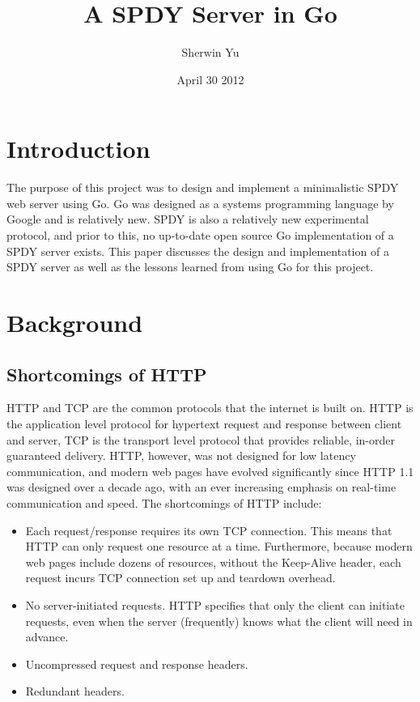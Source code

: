 \documentclass{article}
\begin{document}
\title{A SPDY Server in Go}
\author{Sherwin Yu}
\date{April 30 2012}
\maketitle

\section{Introduction}
\label{Abstract}
The purpose of this project was to design and implement a minimalistic SPDY web server using Go. Go was designed as a systems programming language by Google and is relatively new.  SPDY is also a relatively new experimental protocol, and prior to this, no up-to-date open source Go implementation of a SPDY server exists. This paper discusses the design and implementation of a SPDY server as well as the lessons learned from using Go for this project.

\section{Background}
\label{motivation}
\subsection{Shortcomings of HTTP}
HTTP and TCP are the common protocols that the internet is built on. HTTP is the application level protocol for hypertext request and response between client and server, TCP is the transport level protocol that provides reliable, in-order guaranteed delivery. 
HTTP, however, was not designed for low latency communication, and modern web pages have evolved significantly since HTTP 1.1 was designed over a decade ago, with an ever increasing emphasis on real-time communication and speed. The shortcomings of HTTP include:
\begin{itemize}
  \item Each request/response requires its own TCP connection. This means that HTTP can only request one resource at a time. Furthermore, because modern web pages include dozens of resources, without the Keep-Alive header, each request incurs TCP connection set up and teardown overhead.
  \item No server-initiated requests. HTTP specifies that only the client can initiate requests, even when the server (frequently) knows what the client will need in advance.
  \item Uncompressed request and response headers. 
  \item Redundant headers.
\end{itemize}
\end{document}
